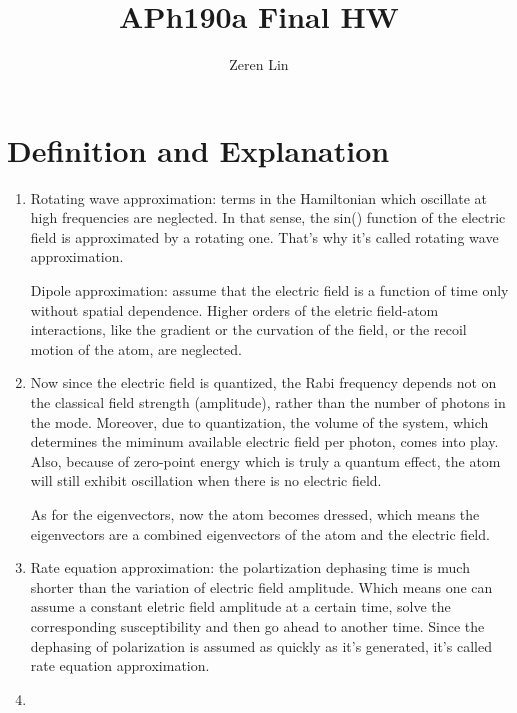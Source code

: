 \documentclass{article}
\title{APh190a Final HW}
\begin{document}
    
    \author{Zeren Lin}
    \maketitle
    
    

    
    \section{ Definition and
Explanation}\label{definition-and-explanation}

\begin{enumerate}
\def\labelenumi{\arabic{enumi}.}
\item
Rotating wave approximation: terms in the Hamiltonian which oscillate at
high frequencies are neglected. In that sense, the sin() function of the
electric field is approximated by a rotating one. That's why it's called
rotating wave approximation.

Dipole approximation: assume that the electric field is a function of
time only without spatial dependence. Higher orders of the eletric
field-atom interactions, like the gradient or the curvation of the
field, or the recoil motion of the atom, are neglected.


\item

Now since the electric field is quantized, the Rabi frequency depends
not on the classical field strength (amplitude), rather than the number
of photons in the mode. Moreover, due to quantization, the volume of the
system, which determines the miminum available electric field per
photon, comes into play. Also, because of zero-point energy which is
truly a quantum effect, the atom will still exhibit oscillation when
there is no electric field.

As for the eigenvectors, now the atom becomes dressed, which means the
eigenvectors are a combined eigenvectors of the atom and the electric
field.

\item

Rate equation approximation: the polartization dephasing time is much
shorter than the variation of electric field amplitude. Which means one
can assume a constant eletric field amplitude at a certain time, solve
the corresponding susceptibility and then go ahead to another time.
Since the dephasing of polarization is assumed as quickly as it's
generated, it's called rate equation approximation.

\item


\end{enumerate}
\end{document}
